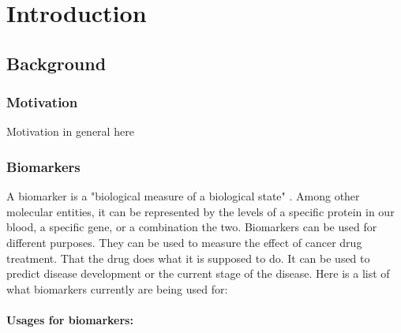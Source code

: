 \part{Introduction}
\label{pa:intro}
\chapter{Background}
\section{Motivation}
Motivation in general here

\section{Biomarkers}
A biomarker is a "biological measure of a biological state"
\cite{biomarker1}. Among other molecular entities, it can be represented by the
levels of a specific protein in our blood, a specific gene, or a combination the
two.  Biomarkers can be used for different purposes. They can be used to measure
the effect of cancer drug treatment. That the drug does what it is supposed to
do.  It can be used to predict disease development or the current stage of the
disease. Here is a list of what biomarkers currently are being used for:
\\\\
\textbf{Usages for biomarkers:} \cite{beyondpsa}
